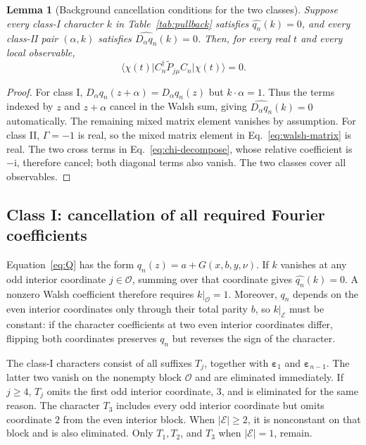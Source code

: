 \documentclass[11pt,a4paper]{article}
\numberwithin{equation}{section}
\newtheorem{lemma}[theorem]{Lemma}
\theoremstyle{definition}
\newcommand{\ii}{\mathrm i}
\newcommand{\ket}[1]{\lvert#1\rangle}
\newcommand{\bra}[1]{\langle#1\rvert}
\newcommand{\E}{\mathcal E}
\newcommand{\Oset}{\mathcal O}
\newcommand{\eps}{\bm\varepsilon}
\begin{document}
\begin{lemma}[Background cancellation conditions for the two classes]
\label{lem:fourier}
Suppose every class-I character $k$ in Table~\ref{tab:pullback} satisfies $\widehat {q_n}(k)=0$, and every class-II pair $(\alpha,k)$ satisfies $\widehat {D_\alpha q_n}(k)=0$. Then, for every real $t$ and every local observable,
\begin{equation}
 \bra{\chi(t)}C_n^\dagger\widetilde P_{j\mu}C_n\ket{\chi(t)}=0.
 \label{eq:bgzero}
\end{equation}
\end{lemma}

\begin{proof}
For class I, $D_\alpha q_n(z+\alpha)=D_\alpha q_n(z)$ but $k\cdot\alpha=1$. Thus the terms indexed by $z$ and $z+\alpha$ cancel in the Walsh sum, giving $\widehat {D_\alpha q_n}(k)=0$ automatically. The remaining mixed matrix element vanishes by assumption. For class II, $\Gamma=-1$ is real, so the mixed matrix element in Eq.~\eqref{eq:walsh-matrix} is real. The two cross terms in Eq.~\eqref{eq:chi-decompose}, whose relative coefficient is $-\ii$, therefore cancel; both diagonal terms also vanish. The two classes cover all observables.
\end{proof}

\subsection{Class I: cancellation of all required Fourier coefficients}

Equation~\eqref{eq:Q} has the form $q_n(z)=a+G(x,b,y,\nu)$. If $k$ vanishes at any odd interior coordinate $j\in\Oset$, summing over that coordinate gives $\widehat {q_n}(k)=0$. A nonzero Walsh coefficient therefore requires $k|_{\Oset}=1$. Moreover, $q_n$ depends on the even interior coordinates only through their total parity $b$, so $k|_{\E}$ must be constant: if the character coefficients at two even interior coordinates differ, flipping both coordinates preserves $q_n$ but reverses the sign of the character.

The class-I characters consist of all suffixes $T_j$, together with $\eps_1$ and $\eps_{n-1}$. The latter two vanish on the nonempty block $\Oset$ and are eliminated immediately. If $j\geq4$, $T_j$ omits the first odd interior coordinate, $3$, and is eliminated for the same reason. The character $T_3$ includes every odd interior coordinate but omits coordinate $2$ from the even interior block. When $|\E|\geq2$, it is nonconstant on that block and is also eliminated. Only $T_1,T_2$, and $T_3$ when $|\E|=1$, remain.
\end{document}
